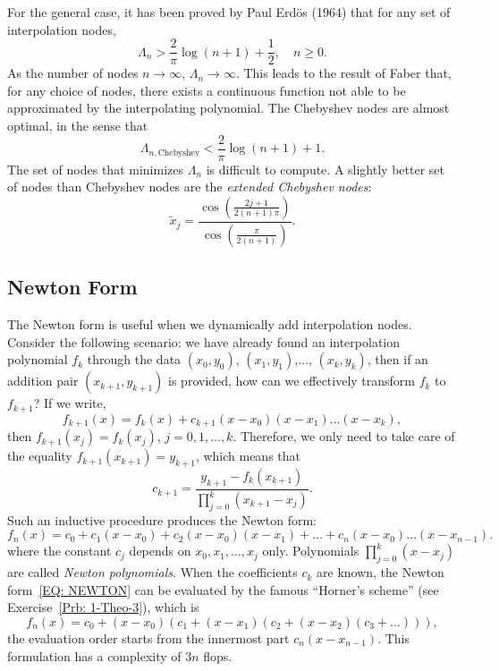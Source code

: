 For the general case, it has been proved by Paul Erd{\"{o}}s (1964) that for any set of interpolation nodes, 
\begin{equation}
    \Lambda_n > \frac{2}{\pi}\log(n+1) + \frac{1}{2},\quad  n\ge 0.
\end{equation}
As the number of nodes $n\to \infty$, $\Lambda_n \to \infty$. This leads to the result of Faber that, for any choice of nodes, there exists a continuous function not able to be approximated by the interpolating polynomial. The Chebyshev nodes are almost optimal, in the sense that 
\begin{equation}
    \Lambda_{n, \textrm{Chebyshev}} < \frac{2}{\pi}\log(n+1) + 1.
\end{equation}
The set of nodes that minimizes $\Lambda_n$ is difficult to compute. A slightly better set of nodes than Chebyshev nodes are the \emph{ extended Chebyshev nodes}:
\begin{equation}
    \tilde{x}_j = \frac{\cos\left(\frac{2j+1}{2(n+1)\pi}\right)}{\cos\left(\frac{\pi}{2(n+1)}\right)}.
\end{equation}
\subsection{Newton Form}
\label{SSec: 2-New-For}
The Newton form is useful when we dynamically add interpolation nodes. Consider the following scenario: we have already found an interpolation polynomial $f_k$ through the data $(x_0, y_0)$, $(x_1, y_1)$,$\dots$, $(x_k, y_k)$, then if an addition pair $(x_{k+1}, y_{k+1})$ is provided, how can we effectively transform $f_k$ to $f_{k+1}$? If we write, 
$$f_{k+1}(x) = f_k(x) + c_{k+1} (x - x_0)(x - x_1)\dots (x - x_{k}), $$
then $f_{k+1}(x_j) = f_k(x_j)$, $j = 0, 1,\dots, k$. Therefore, we only need to take care of the equality $f_{k+1}(x_{k+1}) = y_{k+1}$, which means that 
\begin{equation}\label{EQ: CK}
    c_{k+1} = \frac{y_{k+1} - f_k(x_{k+1})}{\prod_{j=0}^k (x_{k+1} - x_j)}.
\end{equation}
Such an inductive procedure produces the Newton form: 
\begin{equation}\label{EQ: NEWTON}
    f_n(x) = c_0 + c_1 ( x - x_0) + c_2 (x - x_0)(x - x_1)+\dots+c_{n}(x-x_0)\dots (x - x_{n-1}).
\end{equation}
where the constant $c_j$ depends on $x_0, x_1, \dots, x_{j}$ only. Polynomials $\prod_{j=0}^k (x - x_j)$ are called \emph{Newton polynomials}. When the coefficients $c_k$ are known, the Newton form~\eqref{EQ: NEWTON} can be evaluated by the famous ``Horner's scheme'' (see Exercise~\ref{Prb: 1-Theo-3}), which is
\begin{equation}\label{EQ: HORNER}
    f_n(x) = c_0 + (x-x_0)(c_1 + (x-x_1)(c_2 + (x-x_2)(c_3 + \dots))),
\end{equation}
the evaluation order starts from the innermost part $c_n (x -x_{n-1})$. This formulation has a complexity of $3n$ flops. 

